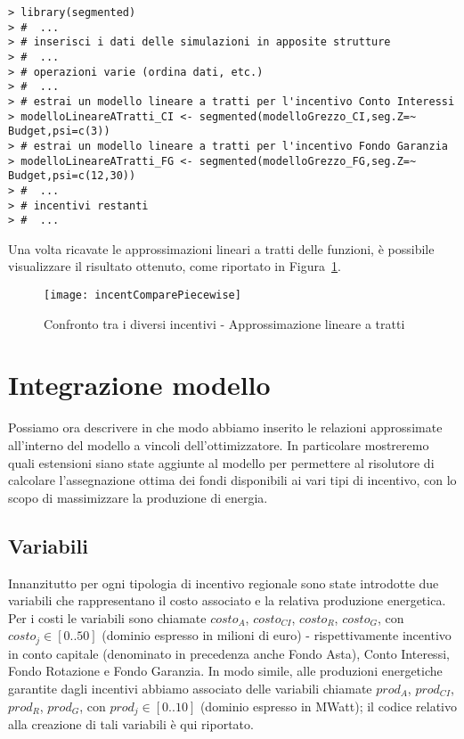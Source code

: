\lstset{language=R}
\begin{lstlisting}
> library(segmented)
> #  ...
> # inserisci i dati delle simulazioni in apposite strutture 
> #  ...
> # operazioni varie (ordina dati, etc.)
> #  ...
> # estrai un modello lineare a tratti per l'incentivo Conto Interessi
> modelloLineareATratti_CI <- segmented(modelloGrezzo_CI,seg.Z=~ Budget,psi=c(3))
> # estrai un modello lineare a tratti per l'incentivo Fondo Garanzia
> modelloLineareATratti_FG <- segmented(modelloGrezzo_FG,seg.Z=~ Budget,psi=c(12,30))
> #  ...
> # incentivi restanti
> #  ...
\end{lstlisting}

Una volta ricavate le approssimazioni lineari a tratti delle funzioni, è possibile visualizzare il risultato ottenuto, come riportato in Figura~\ref{incentCompare_piecewise}.

\begin{figure}[hbt]
	\centering
	\texttt{[image: incentComparePiecewise]}
	\caption{Confronto tra i diversi incentivi - Approssimazione lineare a tratti}
	\label{incentCompare_piecewise}
\end{figure}

\section{Integrazione modello}

Possiamo ora descrivere in che modo abbiamo inserito le relazioni approssimate all'interno del modello a vincoli dell'ottimizzatore. In particolare mostreremo quali estensioni siano state aggiunte al modello per permettere al risolutore di calcolare l'assegnazione ottima dei fondi disponibili ai vari tipi di incentivo, con lo scopo di massimizzare la produzione di energia.

\subsection{Variabili}

Innanzitutto per ogni tipologia di incentivo regionale sono state introdotte due variabili che rappresentano il costo associato e la relativa produzione energetica. Per i costi le variabili sono chiamate $costo_A$, $costo_{CI}$, $costo_R$, $costo_G$, con $costo_j \in[0..50]$ (dominio espresso in milioni di euro) - rispettivamente incentivo in conto capitale (denominato in precedenza anche Fondo Asta), Conto Interessi, Fondo Rotazione e Fondo Garanzia. In modo simile, alle produzioni energetiche garantite dagli incentivi abbiamo associato delle variabili chiamate $prod_A$, $prod_{CI}$, $prod_R$, $prod_G$, con $prod_j \in [0..10]$ (dominio espresso in MWatt); il codice relativo alla creazione di tali variabili è qui riportato.

